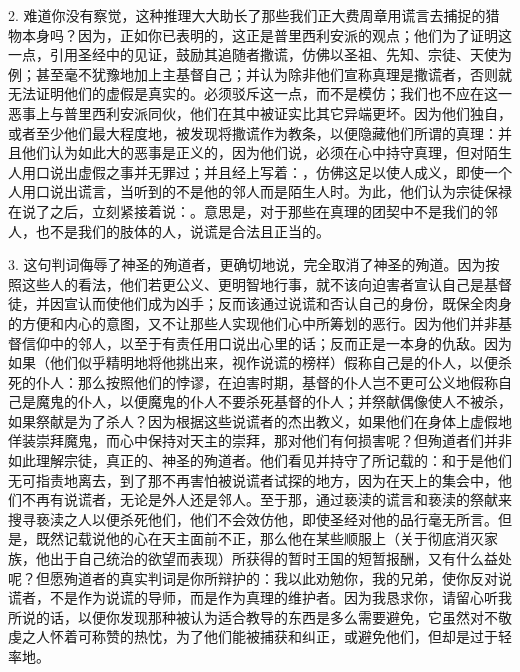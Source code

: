 2. 难道你没有察觉，这种推理大大助长了那些我们正大费周章用谎言去捕捉的猎物本身吗？因为，正如你已表明的，这正是普里西利安派的观点；他们为了证明这一点，引用圣经中的见证，鼓励其追随者撒谎，仿佛以圣祖、先知、宗徒、天使为例；甚至毫不犹豫地加上主基督自己；并认为除非他们宣称真理是撒谎者，否则就无法证明他们的虚假是真实的。必须驳斥这一点，而不是模仿；我们也不应在这一恶事上与普里西利安派同伙，他们在其中被证实比其它异端更坏。因为他们独自，或者至少他们最大程度地，被发现将撒谎作为教条，以便隐藏他们所谓的真理：并且他们认为如此大的恶事是正义的，因为他们说，必须在心中持守真理，但对陌生人用口说出虚假之事并无罪过；并且经上写着：，仿佛这足以使人成义，即使一个人用口说出谎言，当听到的不是他的邻人而是陌生人时。为此，他们认为宗徒保禄在说了之后，立刻紧接着说：。意思是，对于那些在真理的团契中不是我们的邻人，也不是我们的肢体的人，说谎是合法且正当的。\par

3. 这句判词侮辱了神圣的殉道者，更确切地说，完全取消了神圣的殉道。因为按照这些人的看法，他们若更公义、更明智地行事，就不该向迫害者宣认自己是基督徒，并因宣认而使他们成为凶手；反而该通过说谎和否认自己的身份，既保全肉身的方便和内心的意图，又不让那些人实现他们心中所筹划的恶行。因为他们并非基督信仰中的邻人，以至于有责任用口说出心里的话；反而正是一本身的仇敌。因为如果（他们似乎精明地将他挑出来，视作说谎的榜样）假称自己是的仆人，以便杀死的仆人：那么按照他们的悖谬，在迫害时期，基督的仆人岂不更可公义地假称自己是魔鬼的仆人，以便魔鬼的仆人不要杀死基督的仆人；并祭献偶像使人不被杀，如果祭献是为了杀人？因为根据这些说谎者的杰出教义，如果他们在身体上虚假地佯装崇拜魔鬼，而心中保持对天主的崇拜，那对他们有何损害呢？但殉道者们并非如此理解宗徒，真正的、神圣的殉道者。他们看见并持守了所记载的：\newline{}和\newline{}于是他们无可指责地离去，到了那不再害怕被说谎者试探的地方，因为在天上的集会中，他们不再有说谎者，无论是外人还是邻人。至于那，通过亵渎的谎言和亵渎的祭献来搜寻亵渎之人以便杀死他们，他们不会效仿他，即使圣经对他的品行毫无所言。但是，既然记载说他的心在天主面前不正，那么他在某些顺服上（关于彻底消灭家族，他出于自己统治的欲望而表现）所获得的暂时王国的短暂报酬，又有什么益处呢？但愿殉道者的真实判词是你所辩护的：我以此劝勉你，我的兄弟，使你反对说谎者，不是作为说谎的导师，而是作为真理的维护者。因为我恳求你，请留心听我所说的话，以便你发现那种被认为适合教导的东西是多么需要避免，它虽然对不敬虔之人怀着可称赞的热忱，为了他们能被捕获和纠正，或避免他们，但却是过于轻率地。\par

